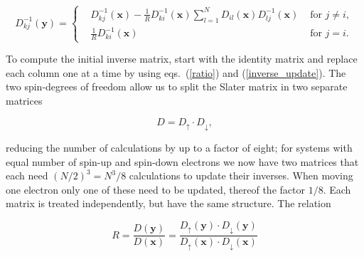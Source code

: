 \begin{equation}
  D_{kj}^{-1}(\mathbf{y})=
  \left\{
  \begin{split}
     &D_{kj}^{-1}(\mathbf{x})-\frac{1}{R}D_{ki}^{-1}(\mathbf{x})
    \sum_{l=1}^N D_{il}(\mathbf{x})D_{lj}^{-1}(\mathbf{x}) &
    \text{   for }j \ne i,\\
     &\frac{1}{R}D_{ki}^{-1}(\mathbf{x}) & \text{   for } j=i.
  \end{split}
  \right.
  \label{inverse_update}
\end{equation}

To compute the initial inverse matrix, start with the identity matrix
and replace each column one at a time by using eqs.~(\ref{ratio})
and (\ref{inverse_update}).
\newline
%
\newline
The two spin-degrees of freedom allow us to split the Slater matrix in
two separate matrices

\begin{equation*}
  D = D_{\uparrow}\cdot D_{\downarrow},
\end{equation*}

reducing the number of calculations by up to a factor of
eight; for systems with equal number of spin-up and spin-down
electrons we now have two matrices that each need $(N/2)^3 = N^3/8$
calculations to update their inverses. When moving one electron only
one of these need to be updated, thereof the factor $1/8$. Each matrix
is treated independently, but have the same structure. The relation

\begin{equation*}
  R = \frac{D(\mathbf{y})}{D(\mathbf{x})} = \frac
  {D_{\uparrow}(\mathbf{y})\cdot D_{\downarrow}(\mathbf{y})}
  {D_{\uparrow}(\mathbf{x})\cdot D_{\downarrow}(\mathbf{x})}
\end{equation*}

